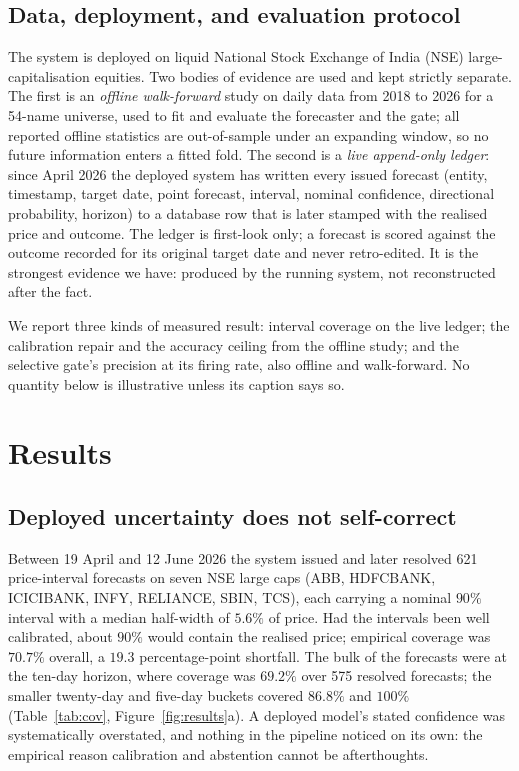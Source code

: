 \documentclass{elektr}
\begin{document}
\subsection{Data, deployment, and evaluation protocol}
\label{sec:data}
The system is deployed on liquid National Stock Exchange of India (NSE) large-capitalisation equities. Two bodies of evidence are used and kept strictly separate. The first is an \emph{offline walk-forward} study on daily data from 2018 to 2026 for a 54-name universe, used to fit and evaluate the forecaster and the gate; all reported offline statistics are out-of-sample under an expanding window, so no future information enters a fitted fold. The second is a \emph{live append-only ledger}: since April 2026 the deployed system has written every issued forecast (entity, timestamp, target date, point forecast, interval, nominal confidence, directional probability, horizon) to a database row that is later stamped with the realised price and outcome. The ledger is first-look only; a forecast is scored against the outcome recorded for its original target date and never retro-edited. It is the strongest evidence we have: produced by the running system, not reconstructed after the fact.

We report three kinds of measured result: interval coverage on the live ledger; the calibration repair and the accuracy ceiling from the offline study; and the selective gate's precision at its firing rate, also offline and walk-forward. No quantity below is illustrative unless its caption says so.

\section{Results}
\label{sec:results}
\subsection{Deployed uncertainty does not self-correct}
\label{sec:resultcov}
Between 19 April and 12 June 2026 the system issued and later resolved 621 price-interval forecasts on seven NSE large caps (ABB, HDFCBANK, ICICIBANK, INFY, RELIANCE, SBIN, TCS), each carrying a nominal $90\%$ interval with a median half-width of $5.6\%$ of price. Had the intervals been well calibrated, about $90\%$ would contain the realised price; empirical coverage was $70.7\%$ overall, a $19.3$ percentage-point shortfall. The bulk of the forecasts were at the ten-day horizon, where coverage was $69.2\%$ over 575 resolved forecasts; the smaller twenty-day and five-day buckets covered $86.8\%$ and $100\%$ (Table~\ref{tab:cov}, Figure~\ref{fig:results}a). A deployed model's stated confidence was systematically overstated, and nothing in the pipeline noticed on its own: the empirical reason calibration and abstention cannot be afterthoughts.
\end{document}
